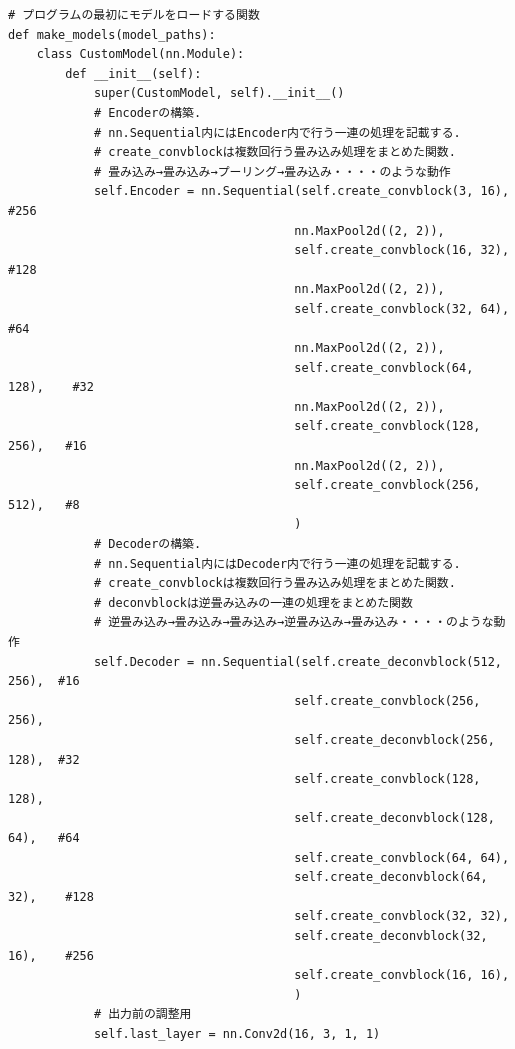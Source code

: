 \documentclass[dvipdfmx]{jsarticle}
\begin{document}
\begin{lstlisting}
# プログラムの最初にモデルをロードする関数
def make_models(model_paths):
    class CustomModel(nn.Module):
        def __init__(self):
            super(CustomModel, self).__init__() 
            # Encoderの構築.
            # nn.Sequential内にはEncoder内で行う一連の処理を記載する.
            # create_convblockは複数回行う畳み込み処理をまとめた関数.
            # 畳み込み→畳み込み→プーリング→畳み込み・・・・のような動作
            self.Encoder = nn.Sequential(self.create_convblock(3, 16),      #256
                                        nn.MaxPool2d((2, 2)), 
                                        self.create_convblock(16, 32),     #128
                                        nn.MaxPool2d((2, 2)), 
                                        self.create_convblock(32, 64),     #64
                                        nn.MaxPool2d((2, 2)), 
                                        self.create_convblock(64, 128),    #32
                                        nn.MaxPool2d((2, 2)), 
                                        self.create_convblock(128, 256),   #16
                                        nn.MaxPool2d((2, 2)), 
                                        self.create_convblock(256, 512),   #8
                                        )
            # Decoderの構築.
            # nn.Sequential内にはDecoder内で行う一連の処理を記載する.
            # create_convblockは複数回行う畳み込み処理をまとめた関数.
            # deconvblockは逆畳み込みの一連の処理をまとめた関数
            # 逆畳み込み→畳み込み→畳み込み→逆畳み込み→畳み込み・・・・のような動作
            self.Decoder = nn.Sequential(self.create_deconvblock(512, 256),  #16
                                        self.create_convblock(256, 256), 
                                        self.create_deconvblock(256, 128),  #32
                                        self.create_convblock(128, 128), 
                                        self.create_deconvblock(128, 64),   #64
                                        self.create_convblock(64, 64), 
                                        self.create_deconvblock(64, 32),    #128
                                        self.create_convblock(32, 32), 
                                        self.create_deconvblock(32, 16),    #256
                                        self.create_convblock(16, 16), 
                                        )
            # 出力前の調整用
            self.last_layer = nn.Conv2d(16, 3, 1, 1)
    

\end{lstlisting}
\end{document}
